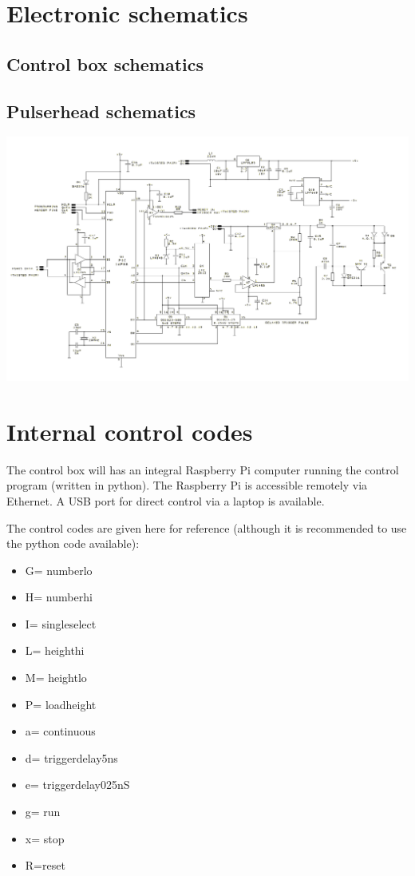 
%
%
\section{Electronic schematics}
\label{app:schematics}
\subsection*{Control box schematics}
\subsection*{Pulserhead schematics}
\includegraphics[width=\linewidth]{figures/pulserhead_schematic.png}
%
%
\section{Internal control codes}
\label{app:internal_codes_design}
The control box will has an integral Raspberry Pi computer running the control program (written in python). The Raspberry Pi is accessible remotely via Ethernet. A USB port for direct control via a laptop is available.

The control codes are given here for reference (although it is recommended to use the python code available):
\begin{itemize}
\item	G= numberlo		
\item H= numberhi
\item I= singleselect
\item L= heighthi
\item M= heightlo
\item P= loadheight
\item a= continuous
\item d= triggerdelay5ns
\item e= triggerdelay025nS
\item g= run
\item x= stop
\item R=reset
\end{itemize}


